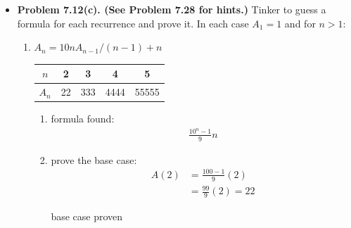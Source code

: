\documentclass{article}
\begin{document}
\begin{itemize}
\begin{enumerate}[label=(\roman*)]
        \end{enumerate}
        \item \textbf{Problem 7.12(c). (See Problem 7.28 for hints.)} Tinker to guess a formula for each recurrence and prove it. In each case $A_1 = 1$ and for $n > 1$:
        \begin{enumerate}[label=(c)]
            \item $A_n = 10nA_{n-1} / (n-1) + n$
            \newline
            \begin{tabular}{ |c|c|c|c|c| } 
                \hline
                $n$ & 2 & 3 & 4 & 5\\ 
                \hline
                $A_n$ & 22 & 333 & 4444 & 55555 \\
                \hline
            \end{tabular}
            \begin{enumerate}[label=\roman*.]
                \item formula found:
                \begin{align*}
                    \frac{10^n-1}{9}n
                \end{align*}
                \item prove the base case:
                \begin{align*}
                    A(2) &= \frac{100-1}{9}(2)\\
                         &= \frac{99}{9}(2) = 22
                \end{align*}
                \begin{center}
                    base case proven
                \end{center}


\end{enumerate}
\end{enumerate}
\end{itemize}
\end{document}
